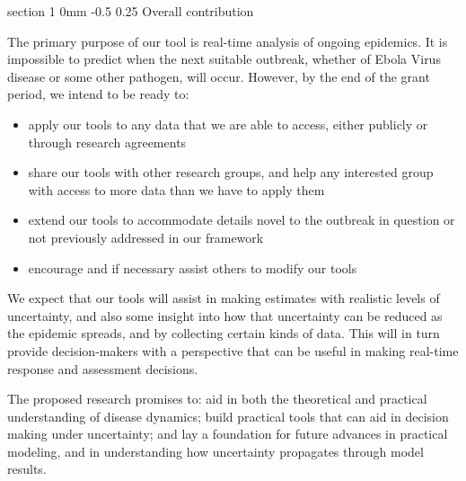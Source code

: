 \documentclass[12pt]{article}
\makeatletter
\renewcommand{\section}{\@startsection  %
{section}%
{1}%
{0mm}%
{-0.5\baselineskip}%
{0.25\baselineskip}%
{\normalfont\Large\bfseries}}%
\makeatother
\begin{document}
\section{Overall contribution}

The primary purpose of our tool is real-time analysis of ongoing epidemics. It is impossible to predict when the next suitable outbreak, whether of Ebola Virus disease or some other pathogen, will occur. However, by the end of the grant period, we intend to be ready to:

\begin{itemize}

\item apply our tools to any data that we are able to access, either publicly or through research agreements

\item share our tools with other research groups, and help any interested group with access to more data than we have to apply them

\item extend our tools to accommodate details novel to the outbreak in question or not previously addressed in our framework

\item encourage and if necessary assist others to modify our tools

\end{itemize}

We expect that our tools will assist in making estimates with realistic levels of uncertainty, and  also some insight into how that uncertainty can be reduced as the epidemic spreads, and by collecting certain kinds of data. This will in turn provide decision-makers with a perspective that can be useful in making real-time response and assessment decisions.

The proposed research promises to: aid in both the theoretical and practical understanding of disease dynamics; build practical tools that can aid in decision making under uncertainty; and lay a foundation for future advances in practical modeling, and in understanding how uncertainty propagates through model results.
\renewcommand{\refname}{\relax}

\newpage
\ \vspace{-3\baselineskip}

\end{document}
